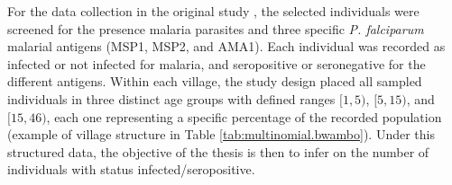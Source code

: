 For the data collection in the original study \cite{drakeley2005altitude}, the selected individuals were screened for the presence malaria parasites and three specific \textit{P. falciparum} malarial antigens (MSP1, MSP2, and AMA1).
Each individual was recorded as infected or not infected for malaria, and seropositive or seronegative for the different antigens.
Within each village, the study design placed all sampled individuals in three distinct age groups with defined ranges $[1,5)$, $[5,15)$, and $[15,46)$, each one representing a specific percentage of the %
recorded population (example of village structure in Table \ref{tab:multinomial.bwambo}).
Under this structured data, the objective of the thesis is then to infer on the number of individuals with status infected/seropositive.

